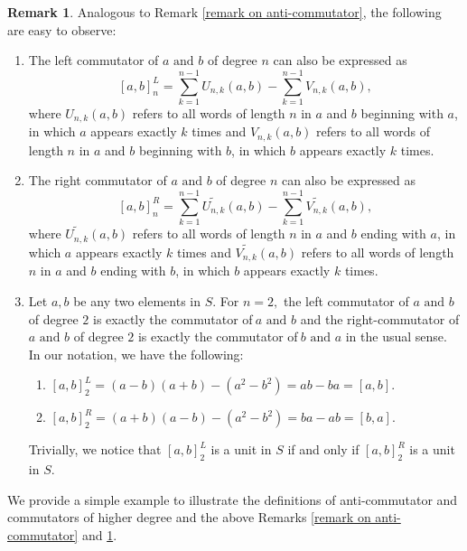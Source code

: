 \documentclass[12pt]{amsart}
\theoremstyle{definition}
\newtheorem{remark}[theorem]{Remark}
\numberwithin{equation}{section}
\begin{document}
\begin{remark}\label{REM: Remark on commutators of higher degree}
    Analogous to Remark \ref{remark on anti-commutator}, the following are easy to observe:
    \begin{enumerate}
     \item  The left commutator of $a \text{ and } b$ of degree $n$ can also be expressed as $$[a,b]_n^L=\sum\limits_{k=1}^{n-1}U_{n,k}(a,b) - \sum\limits_{k=1}^{n-1}V_{n,k}(a,b),$$ where $U_{n,k}(a,b)$ refers to all words of length $n$ in $a$ and $b$ beginning with $a$, in which $a$ appears exactly $k$ times and $V_{n,k}(a,b)$ refers to all words of length $n$ in $a$ and $b$ beginning with $b$, in which $b$ appears exactly $k$ times.
          \item  The right commutator of $a \text{ and } b$ of degree $n$ can also be expressed as $$[a,b]_n^R=\sum\limits_{k=1}^{n-1}\widetilde{U_{n,k}}(a,b) - \sum\limits_{k=1}^{n-1}\widetilde{V_{n,k}}(a,b),$$ where $\widetilde{U_{n,k}}(a,b)$ refers to all words of length $n$ in $a$ and $b$ ending with $a$, in which $a$ appears exactly $k$ times and $\widetilde{V_{n,k}}(a,b)$ refers to all words of length $n$ in $a$ and $b$ ending with $b$, in which $b$ appears exactly $k$ times.
    \item Let $a,b $ be any two elements in $S$. For $n=2,$ the left commutator of $a \text{ and }b$ of degree $2$ is exactly the commutator of$\ a \text{ and }b$ and the right-commutator of $a \text{ and }b$ of degree $2$ is exactly the commutator of$\ b \text{ and }a$ in the usual sense. \\ In our notation, we have the following:
    \begin{enumerate}
        \item $[a,b]_2^L=(a-b)(a+b)-(a^2-b^2)=ab-ba=[a,b]. $
        \item $[a,b]_2^R= (a+b)(a-b)-(a^2-b^2)=ba-ab=[b,a].$
    \end{enumerate} Trivially, we notice that $[a,b]_2^L$ is a unit in $S$ if and only if  $[a,b]_2^R$ is a unit in $S$. 
 \end{enumerate}
\end{remark}
We provide a simple example to illustrate the definitions of anti-commutator and commutators of higher degree and the above Remarks \ref{remark on anti-commutator} and \ref{REM: Remark on commutators of higher degree}. 
\end{document}
